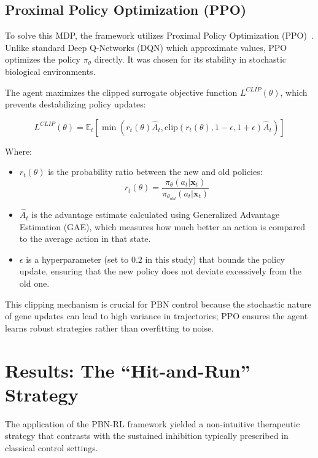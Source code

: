 \documentclass[12pt, a4paper]{report}
\begin{document}
\subsection{Proximal Policy Optimization (PPO)}
To solve this MDP, the framework utilizes Proximal Policy Optimization (PPO)~\cite{schulman2017proximal}. Unlike standard Deep Q-Networks (DQN) which approximate values, PPO optimizes the policy $\pi_\theta$ directly. It was chosen for its stability in stochastic biological environments.

The agent maximizes the clipped surrogate objective function $L^{CLIP}(\theta)$, which prevents destabilizing policy updates:

\begin{equation}
	L^{CLIP}(\theta) = \mathbb{E}_t \left[ \min \left( r_t(\theta)\hat{A}_t, \text{clip}(r_t(\theta), 1-\epsilon, 1+\epsilon)\hat{A}_t \right) \right]
\end{equation}

Where:
\begin{itemize}
	\item $r_t(\theta)$ is the probability ratio between the new and old policies:
	\begin{equation}
		r_t(\theta) = \frac{\pi_\theta(a_t|\mathbf{x}_t)}{\pi_{\theta_{old}}(a_t|\mathbf{x}_t)}
	\end{equation}
	\item $\hat{A}_t$ is the advantage estimate calculated using Generalized Advantage Estimation (GAE), which measures how much better an action is compared to the average action in that state.
	\item $\epsilon$ is a hyperparameter (set to $0.2$ in this study) that bounds the policy update, ensuring that the new policy does not deviate excessively from the old one.
\end{itemize}

This clipping mechanism is crucial for PBN control because the stochastic nature of gene updates can lead to high variance in trajectories; PPO ensures the agent learns robust strategies rather than overfitting to noise.
	
	\section{Results: The ``Hit-and-Run'' Strategy}
	
	The application of the PBN-RL framework yielded a non-intuitive therapeutic strategy that contrasts with the sustained inhibition typically prescribed in classical control settings.
	
\end{document}
